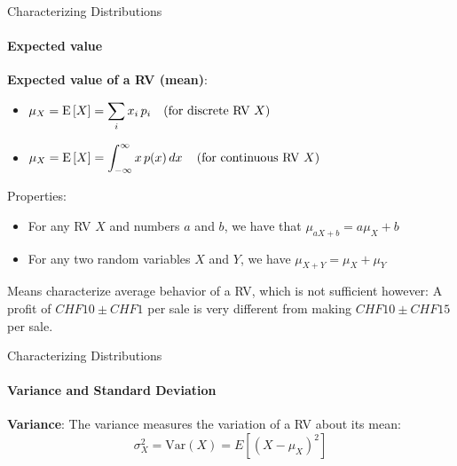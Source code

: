 {    \begin{frame}{Characterizing Distributions}
        \framesubtitle{Expected value}
        \begin{boxed}
            \textbf{Expected value of a RV (mean)}:
            \begin{itemize}
                \item $\displaystyle \mu_X = \operatorname{E}\left[X\right] = \sum_i x_i\,p_i \quad \text{(for discrete RV $X$)}$
                \item $\displaystyle \mu_X = \operatorname{E}\left[X\right] = \int_{-\infty}^\infty x\,p(x) \mathop{dx} \quad \text{(for continuous RV $X$)}$
            \end{itemize}
        \end{boxed}

        Properties:
        \begin{itemize}
            \item For any RV $X$ and numbers $a$ and $b$, we have that $\mu_{aX+b} = a\mu_X + b$
            \item For any two random variables $X$ and $Y$, we have $\mu_{X+Y} = \mu_X+\mu_Y$
        \end{itemize}

        Means characterize average behavior of a RV, which is not sufficient however:
        A profit of $CHF 10 \pm CHF 1$ per sale is very different from making $CHF 10 \pm CHF 15$ per sale.
    \end{frame}


    \begin{frame}{Characterizing Distributions}
        \framesubtitle{Variance and Standard Deviation}

        \begin{boxed}
            \textbf{Variance}:
            The variance measures the variation of a RV about its mean:
            $$\sigma_X^2 = \mathrm{Var}(X) = E\left[(X-\mu_X)^2\right]$$
        \end{boxed}


\end{frame}}
